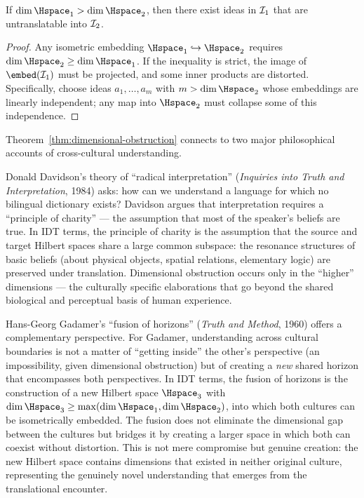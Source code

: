 \begin{theorem}
\label{thm:dimensional-obstruction}
If $\dim \Hspace_1 > \dim \Hspace_2$, then there exist ideas in $\mathcal{I}_1$
that are untranslatable into $\mathcal{I}_2$.
\end{theorem}

\begin{proof}
Any isometric embedding $\Hspace_1 \hookrightarrow \Hspace_2$ requires
$\dim \Hspace_2 \geq \dim \Hspace_1$.  If the inequality is strict, the
image of $\embed(\IS_1)$ must be projected, and some inner products are
distorted.  Specifically, choose ideas $a_1, \ldots, a_m$ with $m > \dim
\Hspace_2$ whose embeddings are linearly independent; any map into
$\Hspace_2$ must collapse some of this independence.
\end{proof}

\begin{interpretation}
\label{interp:ch18:davidson_gadamer}
Theorem~\ref{thm:dimensional-obstruction} connects to two major
philosophical accounts of cross-cultural understanding.

Donald Davidson's theory of ``radical interpretation'' (\textit{Inquiries
into Truth and Interpretation}, 1984) asks: how can we understand a
language for which no bilingual dictionary exists?  Davidson argues that
interpretation requires a ``principle of charity'' --- the assumption that
most of the speaker's beliefs are true.  In IDT terms, the principle of
charity is the assumption that the source and target Hilbert spaces share
a large common subspace: the resonance structures of basic beliefs
(about physical objects, spatial relations, elementary logic) are
preserved under translation.  Dimensional obstruction occurs only in the
``higher'' dimensions --- the culturally specific elaborations that go
beyond the shared biological and perceptual basis of human experience.

Hans-Georg Gadamer's ``fusion of horizons'' (\textit{Truth and Method},
1960) offers a complementary perspective.  For Gadamer, understanding
across cultural boundaries is not a matter of ``getting inside'' the
other's perspective (an impossibility, given dimensional obstruction) but
of creating a \emph{new} shared horizon that encompasses both perspectives.
In IDT terms, the fusion of horizons is the construction of a new Hilbert
space $\Hspace_3$ with $\dim \Hspace_3 \geq \max(\dim \Hspace_1, \dim
\Hspace_2)$, into which both cultures can be isometrically embedded.
The fusion does not eliminate the dimensional gap between the cultures
but bridges it by creating a larger space in which both can coexist
without distortion.  This is not mere compromise but genuine creation:
the new Hilbert space contains dimensions that existed in neither
original culture, representing the genuinely novel understanding that
emerges from the translational encounter.
\end{interpretation}


